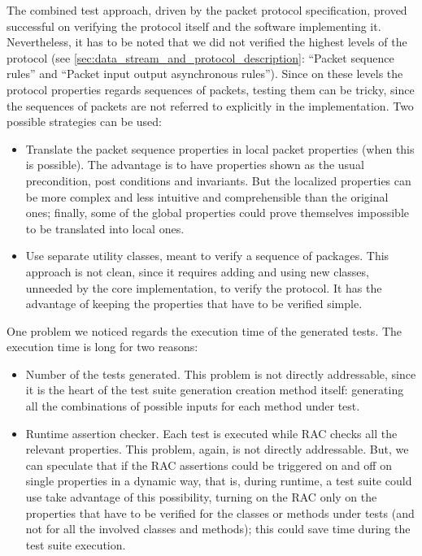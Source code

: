 \documentclass{article} \usepackage{times}
\begin{document}
The combined test approach, driven by the packet protocol
specification, proved successful on verifying the protocol itself and
the software implementing it.  Nevertheless, it has to be noted that we
did not verified the highest levels of the protocol (see
\ref{sec:data_stream_and_protocol_description}: ``Packet sequence
rules'' and ``Packet input output asynchronous rules'').  Since on
these levels the protocol properties regards sequences of packets,
testing them can be tricky, since the sequences of packets are not
referred to explicitly in the implementation.  Two possible strategies
can be used:

\begin{itemize}
\item Translate the packet sequence properties in local packet
  properties (when this is possible).  The advantage is to have
  properties shown as the usual precondition, post conditions and
  invariants.  But the localized properties can be more complex and
  less intuitive and comprehensible than the original ones; finally,
  some of the global properties could prove themselves impossible to
  be translated into local ones.
\item Use separate utility classes, meant to verify a sequence of
  packages.  This approach is not clean, since it requires adding and
  using new classes, unneeded by the core implementation, to verify
  the protocol.  It has the advantage of keeping the properties that
  have to be verified simple.
\end{itemize}

One problem we noticed regards the execution time of the generated
tests.  The execution time is long for two reasons:

\begin{itemize}
\item Number of the tests generated. This problem is not directly
  addressable, since it is the heart of the test suite generation
  creation method itself: generating all the combinations of possible
  inputs for each method under test.
\item Runtime assertion checker. Each test is executed while RAC
  checks all the relevant properties. This problem, again, is not
  directly addressable. But, we can speculate that if the RAC
  assertions could be triggered on and off on single properties in a
  dynamic way, that is, during runtime, a test suite could use take
  advantage of this possibility, turning on the RAC only on the
  properties that have to be verified for the classes or methods under
  tests (and not for all the involved classes and methods); this could
  save time during the test suite execution.
\end{itemize}
\end{document}
